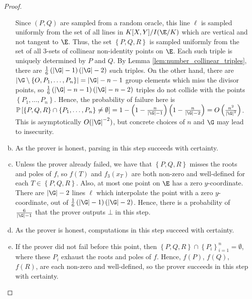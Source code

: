 \documentclass[11pt,letterpaper]{article}
\newcommand{\free}[1]{{\textcolor{red}{#1}}}
\theoremstyle{definition}
\newcommand{\6}{\mathbf}
\newcommand{\7}{\mathcal}
\begin{document}
\begin{proof}
\begin{enumerate}[(a)]
Since $(P, Q)$ are sampled from a random oracle, this line $\ell$ is sampled uniformly from the set of all lines in $K[X,Y]/I(\E/K)$ which are vertical and not tangent to $\E$. Thus, the set $\left\{P,Q,R\right\}$ is sampled uniformly from the set of all $3$-sets of  collinear non-identity points on $\E$. Each such triple is uniquely determined by $P$ and $Q$. By Lemma \ref{lem:number_collinear_triples}, there are $\frac{1}{6}\left(\left|\G\right| - 1\right)\left(\left|\G\right| - 2\right)$ such triples. On the other hand, there are $\left|\G \setminus \left\{O, P_1, \ldots, P_n\right\}\right| = \left|\G\right| - n - 1$ group elements which miss the divisor points, so $\frac{1}{6}\left(\left|\G\right| - n - 1\right)\left(\left|\G\right| - n - 2\right)$ triples do not collide with the points $\left\{P_1, \ldots, P_n\right\}$. Hence, the probability of failure here is $\mathbb{P}\left[\left\{P, Q, R\right\} \cap \left\{P_1, \ldots, P_n\right\} \neq \emptyset\right]  = 1-\left(1-\frac{n}{\left|\G\right|-1}\right)\left(1-\frac{n}{\left|\G\right|-2}\right) = O\left(\frac{n^2}{\left|\G\right|^2}\right)$. This is asymptotically $O(\left|\G\right|^{-2})$, but concrete choices of $n$ and $\G$ may lead to insecurity. 

\item As the prover is honest, parsing in this step succeeds with certainty.

\item 
Unless the prover already failed, we have that $\left\{P, Q, R\right\}$ misses the roots and poles of $f$, so $f(T)$ and $f_3(x_T)$ are both non-zero and well-defined for each $T \in \left\{P,Q,R\right\}$. Also, at most one point on $\E$ has a zero $y$-coordinate. There are $\left|\G\right|-2$ lines $\ell$ which interpolate the point with a zero $y$-coordinate, out of $\frac{1}{6}\left(\left|\G\right|-1\right)\left(\left|\G\right|-2\right)$. Hence, there is a probability of $\frac{6}{\left|\G\right|-1}$ that the prover outputs $\bot$ in this step.

\item As the prover is honest, computations in this step succeed with certainty.

\item If the prover did not fail before this point, then $\left\{P,Q,R\right\} \cap \left\{P_i\right\}_{i=1}^{n} = \emptyset$, where these $P_i$ exhaust the roots and poles of $f$. Hence, $f(P)$, $f(Q)$, $f(R)$, are each non-zero and well-defined, so the prover succeeds in this step with certainty. 


\end{enumerate}
\end{proof}
\end{document}
